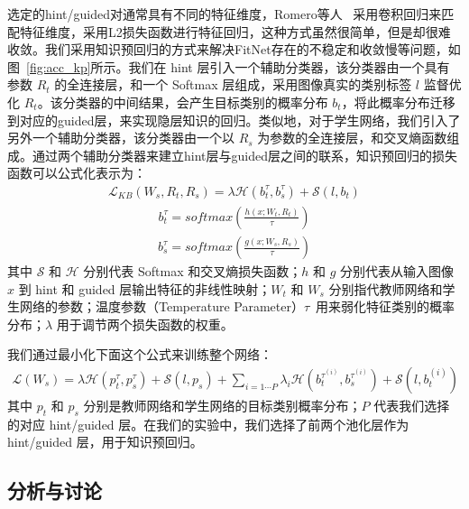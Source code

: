 选定的hint/guided对通常具有不同的特征维度，Romero等人~\cite{romero2014fitnets} 采用卷积回归来匹配特征维度，采用L2损失函数进行特征回归，这种方式虽然很简单，但是却很难收敛。我们采用知识预回归的方式来解决FitNet存在的不稳定和收敛慢等问题，如图~\ref{fig:acc_kp}所示。我们在 hint 层引入一个辅助分类器，该分类器由一个具有参数 $R_t$ 的全连接层，和一个 Softmax 层组成，采用图像真实的类别标签 $l$ 监督优化 $R_t$。该分类器的中间结果，会产生目标类别的概率分布 $b_t$，将此概率分布迁移到对应的guided层，来实现隐层知识的回归。类似地，对于学生网络，我们引入了另外一个辅助分类器，该分类器由一个以 $R_s$ 为参数的全连接层，和交叉熵函数组成。通过两个辅助分类器来建立hint层与guided层之间的联系，知识预回归的损失函数可以公式化表示为：
\begin{align} \label{equ:bridge}
\mathcal{L}_{KB}(W_s, R_t, R_s)={\lambda}\mathcal{H}(b_t^{\tau}, b_s^{\tau})+\mathcal{S}(l, b_t)
\end{align}
\begin{align} \label{equ:bt}
b_t^{\tau}=\mathit{softmax}(\frac{h(x; W_t, R_t)}{\tau})
\end{align}
\begin{align} \label{equ:bs}
b_s^{\tau}=\mathit{softmax}(\frac{g(x; W_s, R_s)}{\tau})
\end{align}
其中 $\mathcal{S}$ 和 $\mathcal{H}$ 分别代表 Softmax 和交叉熵损失函数；$h$ 和 $g$ 分别代表从输入图像 $x$ 到 hint 和 guided 层输出特征的非线性映射；$W_t$ 和 $W_s$ 分别指代教师网络和学生网络的参数；温度参数（Temperature Parameter）$\tau$~\cite{hinton2015distilling}用来弱化特征类别的概率分布；${\lambda}$ 用于调节两个损失函数的权重。

我们通过最小化下面这个公式来训练整个网络：
\begin{align} \label{equ:all}
\mathcal{L}(W_s)={\lambda}\mathcal{H}(p_t^{\tau}, p_s^{\tau}) + \mathcal{S}(l, p_s) + \sum_{i=1{\cdots}P}{\lambda}_i\mathcal{H}(b_t^{\tau^{(i)}}, b_s^{\tau^{(i)}})+\mathcal{S}(l, b_t^{(i)})
\end{align}
其中 $p_t$ 和 $p_s$ 分别是教师网络和学生网络的目标类别概率分布；$P$ 代表我们选择的对应 hint/guided 层。在我们的实验中，我们选择了前两个池化层作为 hint/guided 层，用于知识预回归。

\subsection{分析与讨论}
\label{sec:acc:model:discuss}

